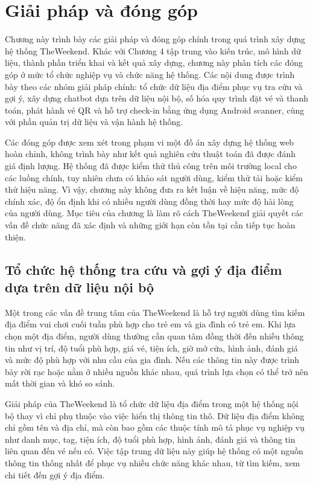 \documentclass[../DoAn.tex]{subfiles}
\begin{document}
\chapter{Giải pháp và đóng góp}

Chương này trình bày các giải pháp và đóng góp chính trong quá trình xây dựng hệ thống TheWeekend. Khác với Chương 4 tập trung vào kiến trúc, mô hình dữ liệu, thành phần triển khai và kết quả xây dựng, chương này phân tích các đóng góp ở mức tổ chức nghiệp vụ và chức năng hệ thống. Các nội dung được trình bày theo các nhóm giải pháp chính: tổ chức dữ liệu địa điểm phục vụ tra cứu và gợi ý, xây dựng chatbot dựa trên dữ liệu nội bộ, số hóa quy trình đặt vé và thanh toán, phát hành vé QR và hỗ trợ check-in bằng ứng dụng Android scanner, cùng với phần quản trị dữ liệu và vận hành hệ thống.

Các đóng góp được xem xét trong phạm vi một đồ án xây dựng hệ thống web hoàn chỉnh, không trình bày như kết quả nghiên cứu thuật toán đã được đánh giá định lượng. Hệ thống đã được kiểm thử thủ công trên môi trường local cho các luồng chính, tuy nhiên chưa có khảo sát người dùng, kiểm thử tải hoặc kiểm thử hiệu năng. Vì vậy, chương này không đưa ra kết luận về hiệu năng, mức độ chính xác, độ ổn định khi có nhiều người dùng đồng thời hay mức độ hài lòng của người dùng. Mục tiêu của chương là làm rõ cách TheWeekend giải quyết các vấn đề chức năng đã xác định và những giới hạn còn tồn tại cần tiếp tục hoàn thiện.

\section{Tổ chức hệ thống tra cứu và gợi ý địa điểm dựa trên dữ liệu nội bộ}

Một trong các vấn đề trung tâm của TheWeekend là hỗ trợ người dùng tìm kiếm địa điểm vui chơi cuối tuần phù hợp cho trẻ em và gia đình có trẻ em. Khi lựa chọn một địa điểm, người dùng thường cần quan tâm đồng thời đến nhiều thông tin như vị trí, độ tuổi phù hợp, giá vé, tiện ích, giờ mở cửa, hình ảnh, đánh giá và mức độ phù hợp với nhu cầu của gia đình. Nếu các thông tin này được trình bày rời rạc hoặc nằm ở nhiều nguồn khác nhau, quá trình lựa chọn có thể trở nên mất thời gian và khó so sánh.

Giải pháp của TheWeekend là tổ chức dữ liệu địa điểm trong một hệ thống nội bộ thay vì chỉ phụ thuộc vào việc hiển thị thông tin thô. Dữ liệu địa điểm không chỉ gồm tên và địa chỉ, mà còn bao gồm các thuộc tính mô tả phục vụ nghiệp vụ như danh mục, tag, tiện ích, độ tuổi phù hợp, hình ảnh, đánh giá và thông tin liên quan đến vé nếu có. Việc tập trung dữ liệu này giúp hệ thống có một nguồn thông tin thống nhất để phục vụ nhiều chức năng khác nhau, từ tìm kiếm, xem chi tiết đến gợi ý địa điểm.
\end{document}
